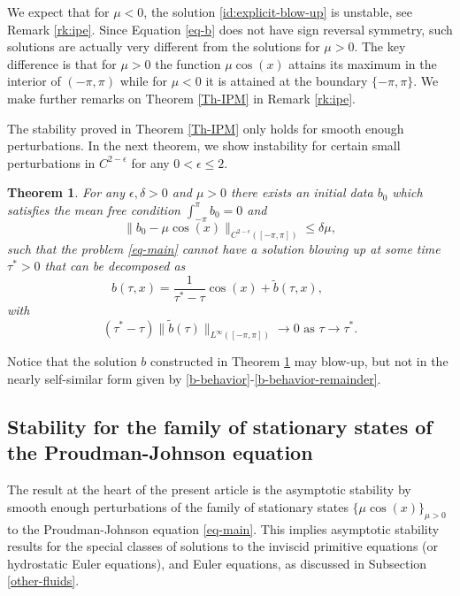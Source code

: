 \documentclass[12pt]{amsart}
\numberwithin{equation}{section}
\numberwithin{equation}{section}
\newtheorem{thm}{Theorem}[section]
\begin{document}
We expect that for $\mu<0$, the solution \eqref{id:explicit-blow-up} is unstable, see Remark \ref{rk:ipe}. Since Equation \eqref{eq-b} does not have sign reversal symmetry, such solutions are actually very different from the solutions for $\mu>0$. The key difference is that for $\mu>0$ the function $\mu \cos(x)$ attains its maximum in the interior of $(-\pi,\pi)$ while for $\mu<0$ it is attained at the boundary $\{-\pi,\pi\}$. We make further remarks on Theorem \ref{Th-IPM} in Remark \ref{rk:ipe}.


The stability proved in Theorem \ref{Th-IPM} only holds for smooth enough perturbations. In the next theorem, we show instability for certain small perturbations in $C^{2-\epsilon}$ for any $0<\epsilon\leq 2$.


\begin{thm} \label{Th-main-4} 
For any $\epsilon,  \delta>0$ and $\mu>0$ there exists an initial data $b_0$ which satisfies the mean free condition $\int_{-\pi}^\pi b_0=0$ and
\begin{equation}\label{Th-ipm-4}
\|b_0 - {\mu}\cos ( x)\|_{C^{2-\epsilon}([-\pi,\pi])}\leq \delta \mu,
\end{equation}
such that the problem \eqref{eq-main} cannot have a solution blowing up at some time $\tau^*>0$ that can be decomposed as
\begin{equation}\label{TH4-behavior}
b(\tau,x)=\frac{1}{\tau^*-\tau}\cos(x)+\tilde b(\tau,x), \qquad 
\end{equation}
with
\begin{equation}\label{TH4-behavior-2}
(\tau^*-\tau)\| \tilde b(\tau)\|_{L^\infty([-\pi,\pi])} \to 0 \mbox{ as }\tau\to \tau^*.
\end{equation}
\end{thm}

 {Notice that the solution $b$ constructed in Theorem \ref{Th-main-4} may blow-up, but not in the nearly self-similar form given by \eqref{b-behavior}-\eqref{b-behavior-remainder}.}


\subsection{Stability for the family of stationary states of the Proudman-Johnson equation}


The result at the heart of the present article is the asymptotic stability by smooth enough perturbations of the family of stationary states $\{\mu \cos(x)\}_{\mu>0}$ to the Proudman-Johnson equation \eqref{eq-main}. This implies asymptotic stability results for the special classes of solutions to the inviscid primitive equations (or hydrostatic Euler equations), and Euler equations, as discussed in Subsection \ref{other-fluids}.
\end{document}
